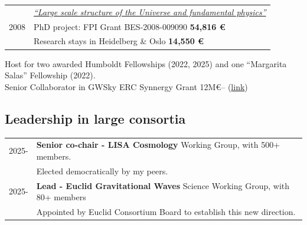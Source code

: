 \documentclass[11pt,a4paper]{article}
\begin{document}
\begin{longtable}{l p{14.5 cm}}
\\[1pt]
& \href{https://cordis.europa.eu/project/id/706434}{\textit{``Large scale structure of the Universe and fundamental physics''}}\\[3pt]
2008 & PhD project: FPI Grant BES-2008-009090 \textbf{54,816 \euro}  %
\\[1pt] & Research stays in Heidelberg \& Oslo \textbf{14,550 \euro}
 \end{longtable}
\vspace{-8pt}\noindent
Host for two awarded Humboldt Fellowships (2022, 2025) and one ``Margarita Salas'' Fellowship (2022).
\\
Senior Collaborator in GWSky ERC Synnergy Grant 12M\euro -- (\href{https://gwsky.org/people/}{link}) 

\subsection*{Leadership in large consortia}
\vspace{-0.3cm}
\begin{longtable}{l p{14.5 cm}}
2025- & \textbf{Senior co-chair - LISA Cosmology} Working Group, with 500+ members.
 \\ & Elected democratically by my peers.  \\[3pt]
2025- & \textbf{Lead - Euclid Gravitational Waves} Science Working Group, with 80+ members
\\ & Appointed by Euclid Consortium Board to establish this new direction. %
\end{longtable}

\newpage
\end{document}

